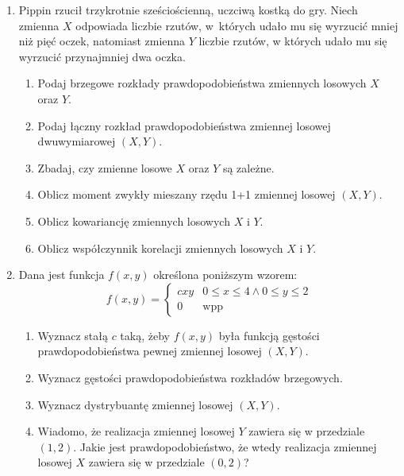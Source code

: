 \documentclass[twoside]{mwart}
\newcommand{\ans}[1]{}
\newcommand{\ans}[1]{\par\emph{Odpowiedź:} #1}
\begin{document}
\begin{enumerate}
\item Pippin rzucił trzykrotnie sześciościenną, uczciwą kostką do gry. Niech zmienna $X$ odpowiada liczbie rzutów, w~których udało mu się wyrzucić mniej niż pięć
oczek, natomiast zmienna $Y$ liczbie rzutów, w których udało mu się wyrzucić przynajmniej dwa oczka.
\begin{enumerate}
\item Podaj brzegowe rozkłady prawdopodobieństwa zmiennych losowych $X$ oraz $Y$.
\item Podaj łączny rozkład prawdopodobieństwa zmiennej losowej dwuwymiarowej $(X,Y)$.
\item Zbadaj, czy zmienne losowe $X$ oraz $Y$ są zależne.
\item Oblicz moment zwykły mieszany rzędu 1+1 zmiennej losowej $(X,Y)$.
\item Oblicz kowariancję zmiennych losowych $X$ i $Y$.
\item Oblicz współczynnik korelacji zmiennych losowych $X$ i $Y$.
\end{enumerate}

\item Dana jest funkcja $f(x,y)$ określona poniższym wzorem:
\[ f(x,y)=\begin{cases} cxy & 0\leq x \leq 4 \land 0\leq y\leq 2 \\ 0 & \text{wpp}\end{cases} \]
\begin{enumerate}
\item Wyznacz stałą $c$ taką, żeby $f(x,y)$ była funkcją gęstości prawdopodobieństwa pewnej zmiennej losowej $(X,Y)$. \ans{$c=\frac{1}{16}$}
\item Wyznacz gęstości prawdopodobieństwa rozkładów brzegowych. \ans{$f_X(u)=\frac{u}{8} f_Y(v)=\frac{v}{2}$}
\item Wyznacz dystrybuantę zmiennej losowej $(X,Y)$. \ans{\[F(u,v)=\begin{cases}
	0 & u\leq 0 \lor v\leq 0 \\
	\frac{u^2v^2}{64} & 0<u\leq 4 \land 0<v\leq 2 \\
	\frac{u^2}{16} & 0<u\leq 4 \land v>2 \\
	\frac{v^2}{4} & u> 4 \land 0<v\leq 2 \\
	1 & u>4\land v>2
	\end{cases}\]}
\item Wiadomo, że realizacja zmiennej losowej $Y$ zawiera się w przedziale $(1,2)$. Jakie jest prawdopodobieństwo, że wtedy realizacja zmiennej losowej $X$ zawiera się w przedziale $(0,2)$?
\ans{$P(0<X<2|1<Y<2)=\frac{P(0<X<2,1<Y<2)}{P(1<Y<2)}=\frac{F(2,2)-F(2,1)-F(0,2)+F(0,1)}{F_Y(2)-F_Y(1)}=\frac{\frac{1}{4}-\frac{1}{16}-0+0}{1-\frac{1}{4}}=\frac{3}{16}\frac{4}{3}=\frac{1}{4}$}
\end{enumerate}
\end{enumerate}
\clearpage
\end{document}
